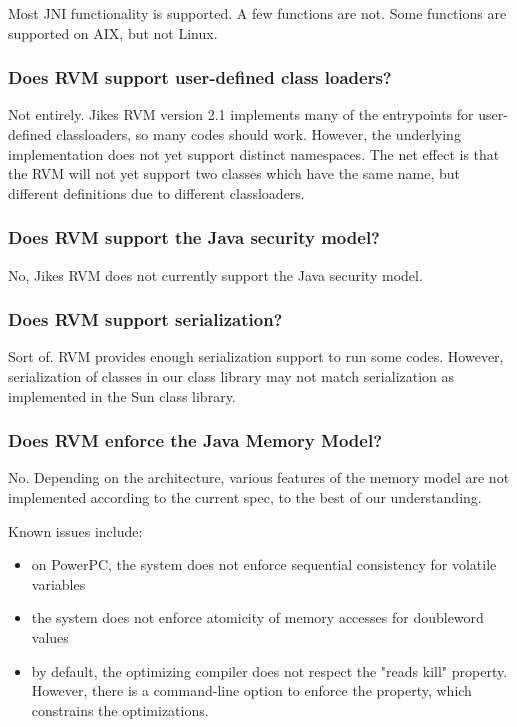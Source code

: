 Most JNI functionality is supported. A few functions are not. 
Some functions are supported on AIX\AIXTMFootnote,
but not Linux.

\subsubsection{Does RVM support user-defined class loaders?}

Not entirely.  Jikes RVM version 2.1 implements many of the entrypoints
for user-defined classloaders, so many codes should work.  However, the
underlying implementation does not yet support distinct namespaces.  The
net effect is that the RVM will not yet support two classes which have the
same name, but different definitions due to different classloaders.

\subsubsection{Does RVM support the Java security model?} 

No, Jikes RVM does not currently support the Java security
model.

\subsubsection{Does RVM support serialization?}

Sort of.  RVM provides enough serialization support to run some codes.  
However, serialization of classes in our class library may not match
serialization as implemented in the Sun class library.

\subsubsection{Does RVM enforce the Java Memory Model?}

No. Depending on the architecture, various features of the memory model
are not implemented according to the current spec, to the best of our
understanding.

Known issues include:
\begin{itemize}
\item on PowerPC\PowerPCTMFootnote, the system does not enforce
sequential consistency for 
volatile variables
\item the system does not enforce atomicity of memory accesses for
doubleword values
\item by default, the optimizing compiler does not respect the "reads
kill" property.  However, there is a command-line option to enforce the
property, which constrains the optimizations.
\end{itemize}


